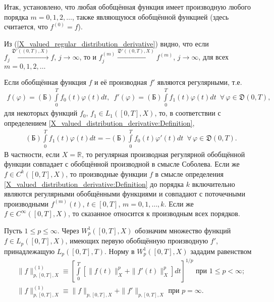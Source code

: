 \documentclass{report}
\begin{document}
Итак, установлено, что любая обобщённая функция имеет производную любого порядка $m=0,1,2,\dots$, также являющуюся обобщённой функцией (здесь считается, что $f^{(0)}=f$).

Из (\ref{X_valued_regular_distribution_derivative}) видно, что если $f_j\stackrel{\mathfrak{D}'((0,T),X)}{\longrightarrow}f$, $j\to\infty$, то и $f_j^{(m)}
\stackrel{\mathfrak{D}'((0,T),X)}{\longrightarrow}f^{(m)}$, $j\to\infty$, для всех  $m=0,1,2,\dots$

Если обобщённая функция $f$ и её производная $f'$ являются регулярными, т.е.
\begin{gather*}
f(\varphi)=(\textrm{Б})\int\limits_0^T f_0(t)\varphi(t)dt,\,\,\,f'(\varphi)=(\textrm{Б})\int\limits_0^T f_1(t)\varphi(t)dt\,\,\,\forall\,\varphi\in\mathfrak{D}(0,T),
\end{gather*}
для некоторых функций $f_0$, $f_1\in L_1([0,T],X)$, то, в соответствии с определением \ref{X_valued_distribution_derivative:Definition},
\begin{gather}\label{X_valued_regular_distribution_derivative:regular}
(\textrm{Б})\int\limits_0^T f_1(t)\varphi(t)dt=-(\textrm{Б})\int\limits_0^T f_0(t)\varphi'(t)dt\,\,\,\forall\,\varphi\in\mathfrak{D}(0,T).
\end{gather}
В частности, если $X=\mathbb{R}$, то регулярная производная регулярной обобщённой функции совпадает с обобщённой производной в смысле Соболева. Если же $f\in C^k([0,T],X)$, то производные
функции $f$ в смысле определения \ref{X_valued_distribution_derivative:Definition} до порядка $k$ включительно  являются регулярными обобщёнными функциями и совпадают с поточечными
производными $f^{(m)}(t)$, $t\in[0,T]$, $m=0,1,\dots,k$. Если же $f\in C^\infty([0,T],X)$, то сказанное относится к производным всех порядков.


Пусть $1\leqslant p\leqslant \infty$. Через $W^1_p([0,T],X)$ обозначим множество функций $f\in L_p([0,T],X)$, имеющих первую обобщённую производную $f'$, принадлежащую $L_p([0,T],T)$.
Норму в $W^1_p([0,T],X)$ зададим равенством
\begin{gather*}
\|f\|_{p,[0,T],X}^{(1)}\equiv\left[\int\limits_0^T[\|f(t)\|^p_X+\|f'(t)\|^p_X]dt\right]^{1/p}\text{ при $1\leqslant p<\infty$};\\
\|f\|_{p,[0,T],X}^{(1)}\equiv\|f\|_{p,[0,T],X}+\|f'\|_{p,[0,T],X}\text{ при $p=\infty$}.
\end{gather*}
\end{document}
